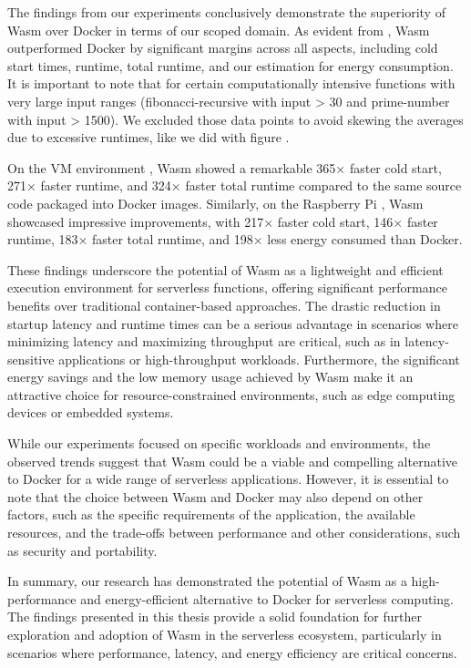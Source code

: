 \documentclass[
  table]{report}
\begin{document}
The findings from our experiments conclusively demonstrate the
superiority of \ac{Wasm} over Docker in terms of our scoped domain. As
evident from , Wasm outperformed Docker
by significant margins across all aspects, including cold start times,
runtime, total runtime, and our estimation for energy consumption. It is
important to note that for certain computationally intensive functions
with very large input ranges (fibonacci-recursive with input
\textgreater{} 30 and prime-number with input \textgreater{} 1500). We
excluded those data points to avoid skewing the averages due to
excessive runtimes, like we did with figure
.

On the VM environment , Wasm showed a remarkable 365×
faster cold start, 271× faster runtime, and 324× faster total runtime
compared to the same source code packaged into Docker images. Similarly,
on the Raspberry Pi , Wasm showcased impressive
improvements, with 217× faster cold start, 146× faster runtime, 183×
faster total runtime, and 198× less energy consumed than Docker.

These findings underscore the potential of Wasm as a lightweight and
efficient execution environment for serverless functions, offering
significant performance benefits over traditional container-based
approaches. The drastic reduction in startup latency and runtime times
can be a serious advantage in scenarios where minimizing latency and
maximizing throughput are critical, such as in latency-sensitive
applications or high-throughput workloads. Furthermore, the significant
energy savings and the low memory usage
\citep{shillakerFaasmLightweightIsolation2020a} achieved by \ac{Wasm}
make it an attractive choice for resource-constrained environments, such
as edge computing devices or embedded systems.

While our experiments focused on specific workloads and environments,
the observed trends suggest that Wasm could be a viable and compelling
alternative to Docker for a wide range of serverless applications.
However, it is essential to note that the choice between Wasm and Docker
may also depend on other factors, such as the specific requirements of
the application, the available resources, and the trade-offs between
performance and other considerations, such as security and portability.

In summary, our research has demonstrated the potential of Wasm as a
high-performance and energy-efficient alternative to Docker for
serverless computing. The findings presented in this thesis provide a
solid foundation for further exploration and adoption of Wasm in the
serverless ecosystem, particularly in scenarios where performance,
latency, and energy efficiency are critical concerns.
\end{document}
